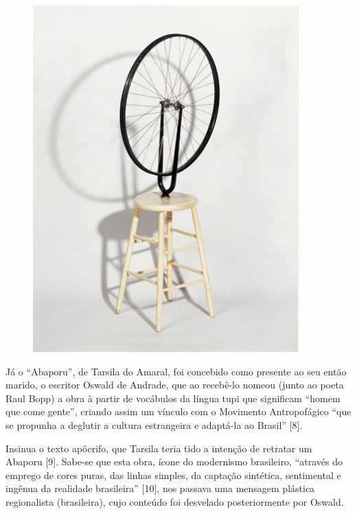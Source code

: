 \begin{figure}[H]
    \centering
    \includegraphics[width=0.65\linewidth]{textos/img/duchamp_a_roda_de_bicicleta.jpg}
    \\
\end{figure}

Já o “Abaporu”, de Tarsila do Amaral, foi concebido como presente ao seu então marido, o escritor Oswald de Andrade, que ao recebê-lo nomeou (junto ao poeta Raul Bopp) a obra à partir de vocábulos da língua tupi que significam “homem que come gente”, criando assim um vínculo com o Movimento Antropofágico “que se propunha a deglutir a cultura estrangeira e adaptá-la ao Brasil” [8].

Insinua o texto apócrifo, que Tarsila teria tido a intenção de retratar um Abaporu [9]. Sabe-se que esta obra, ícone do modernismo brasileiro, “através do emprego de cores puras, das linhas simples, da captação sintética, sentimental e ingênua da realidade brasileira” [10], nos passava uma mensagem plástica regionalista (brasileira), cujo conteúdo foi desvelado posteriormente por Oswald.

